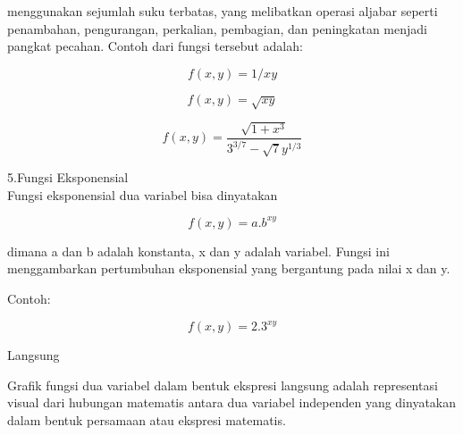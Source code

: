 \documentclass[12pt,arial,letterpaper]{book}
\begin{document}
\begin{eulercomment}
\begin{eulercomment}
\begin{eulercomment}
\begin{eulercomment}
\begin{eulercomment}
\begin{eulercomment}
\begin{eulercomment}
\begin{eulercomment}
\begin{eulercomment}
\begin{eulercomment}
\begin{eulercomment}
\begin{eulercomment}
\begin{eulercomment}
\begin{eulercomment}
\begin{eulercomment}
\begin{eulercomment}
\begin{eulercomment}
\begin{eulercomment}
\begin{eulercomment}
menggunakan sejumlah suku terbatas, yang melibatkan operasi aljabar
seperti penambahan, pengurangan, perkalian, pembagian, dan peningkatan
menjadi pangkat pecahan. Contoh dari fungsi tersebut adalah:\\
\end{eulercomment}
\begin{eulerformula}
\[
f(x,y)=1/xy
\]
\end{eulerformula}
\begin{eulerformula}
\[
f(x,y)=\sqrt{xy}
\]
\end{eulerformula}
\begin{eulerformula}
\[
f(x,y)=\frac{\sqrt{1+x^3}}{3^{3/7}-\sqrt{7}y^{1/3}}
\]
\end{eulerformula}
\begin{eulercomment}
5.Fungsi Eksponensial\\
Fungsi eksponensial dua variabel bisa dinyatakan\\
\end{eulercomment}
\begin{eulerformula}
\[
f(x,y)=a.b^{xy}
\]
\end{eulerformula}
\begin{eulercomment}
dimana a dan b adalah konstanta, x dan y adalah variabel. Fungsi ini
menggambarkan pertumbuhan eksponensial yang bergantung pada nilai x
dan y.

Contoh:\\
\end{eulercomment}
\begin{eulerformula}
\[
f(x,y)= 2.3^{xy}
\]
\end{eulerformula}
\begin{eulercomment}
\end{eulercomment}
\begin{eulercomment}
Langsung

Grafik fungsi dua variabel dalam bentuk ekspresi langsung adalah
representasi visual dari hubungan matematis antara dua variabel
independen yang dinyatakan dalam bentuk persamaan atau ekspresi
matematis.


\end{eulercomment}
\end{eulercomment}
\end{eulercomment}
\end{eulercomment}
\end{eulercomment}
\end{eulercomment}
\end{eulercomment}
\end{eulercomment}
\end{eulercomment}
\end{eulercomment}
\end{eulercomment}
\end{eulercomment}
\end{eulercomment}
\end{eulercomment}
\end{eulercomment}
\end{eulercomment}
\end{eulercomment}
\end{eulercomment}
\end{eulercomment}
\end{document}
